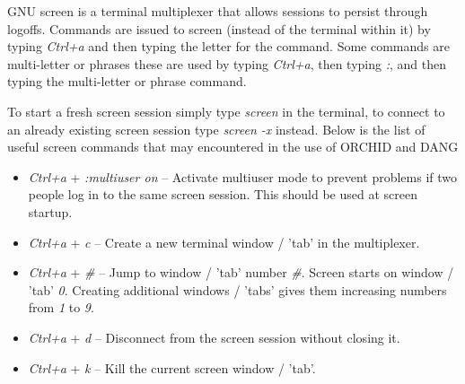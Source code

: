 \documentclass[onecolumn, 10pt, letterpaper, twoside]{article}
\begin{document}
GNU screen is a terminal multiplexer that allows sessions to persist through logoffs. Commands are issued to screen (instead of the terminal within it) by typing \emph{Ctrl+a} and then typing the letter for the command. Some commands are multi-letter or phrases these are used by typing \emph{Ctrl+a}, then typing \emph{:}, and then typing the multi-letter or phrase command.

To start a fresh screen session simply type \emph{screen} in the terminal, to connect to an already existing screen session type \emph{screen -x} instead. Below is the list of useful screen commands that may encountered in the use of ORCHID and DANG
\begin{itemize}
\item \emph{Ctrl+a} + \emph{:multiuser on}  --  Activate multiuser mode to prevent problems if two people log in to the same screen session. This should be used at screen startup.
\item \emph{Ctrl+a} + \emph{c}  --  Create a new terminal window / 'tab' in the multiplexer.
\item \emph{Ctrl+a} + \emph{\#}  --  Jump to window / 'tab' number \emph{\#}. Screen starts on window / 'tab' \emph{0}. Creating additional windows / 'tabs' gives them increasing numbers from \emph{1} to \emph{9}.
\item \emph{Ctrl+a} + \emph{d}  --  Disconnect from the screen session without closing it.
\item \emph{Ctrl+a} + \emph{k}  --  Kill the current screen window / 'tab'.
\end{itemize}
\end{document}

